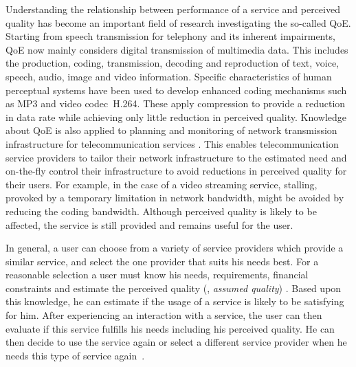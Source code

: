 Understanding the relationship between performance of a service and perceived quality has become an important field of research investigating the so-called \ac{QoE}.
Starting from speech transmission for telephony \citep[][]{ieee_audio_and_electroacoustics_group_ieee_1969} and its inherent impairments, \ac{QoE} now mainly considers digital transmission of multimedia data. %
This includes the production, coding, transmission, decoding and reproduction of text, voice, speech, audio, image and video information.
Specific characteristics of human perceptual systems have been used to develop enhanced coding mechanisms such as \ac{MP3} and video codec~H.264.
These apply compression to provide a reduction in data rate while achieving only little reduction in perceived quality.
Knowledge about \ac{QoE} is also applied to planning and monitoring of network transmission infrastructure for telecommunication services \citep[][]{schatz_qoe-based_2014}.
This enables telecommunication service providers to tailor their network infrastructure to the estimated need and on-the-fly control their infrastructure to avoid reductions in perceived quality for their users.
For example, in the case of a video streaming service, stalling, provoked by a temporary limitation in network bandwidth, might be avoided by reducing the coding bandwidth.
Although perceived quality is likely to be affected, the service is still provided and remains useful for the user.

In general, a user can choose from a variety of service providers which provide a similar service, and select the one provider that suits his needs best.
For a reasonable selection a user must know his needs, requirements, financial constraints and estimate the perceived quality (\ie, \emph{assumed quality}) \citep[][p.~13]{raake_quality_2014}.
Based upon this knowledge, he can estimate if the usage of a service is likely to be satisfying for him.
After experiencing an interaction with a service, the user can then evaluate if this service fulfills his needs including his perceived quality.
He can then decide to use the service again or select a different service provider when he needs this type of service again~\citep[][]{geerts_linking_2010}.

